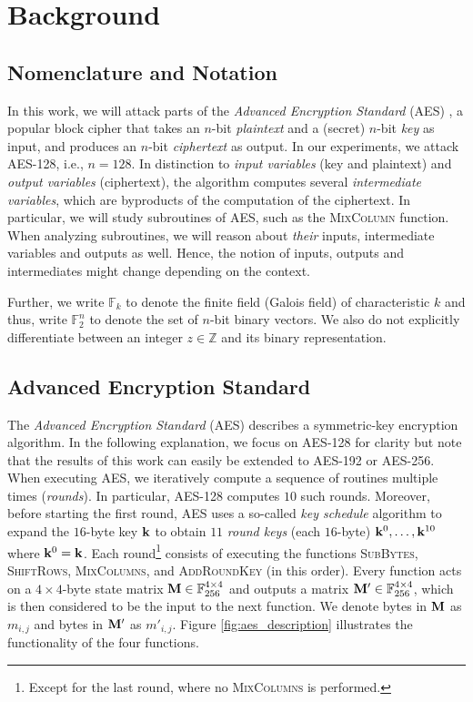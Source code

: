 \chapter{Background}
\label{cha:background}
\section{Nomenclature and Notation}
In this work, we will attack parts of the \textit{Advanced Encryption Standard} (AES) \cite{aes}, a popular block cipher that takes an $n$-bit \emph{plaintext} and a (secret) $n$-bit \emph{key} as input, and produces an $n$-bit \emph{ciphertext} as output. In our experiments, we attack AES-128, i.e., $n=128$. In distinction to \emph{input variables} (key and plaintext) and \emph{output variables} (ciphertext), the algorithm computes several \emph{intermediate variables}, which are byproducts of the computation of the ciphertext. In particular, we will study subroutines of AES, such as the \textsc{MixColumn} function. When analyzing subroutines, we will reason about \emph{their} inputs, intermediate variables and outputs as well. Hence, the notion of inputs, outputs and intermediates might change depending on the context. %

Further, we write $\mathbb{F}_k$ to denote the finite field (Galois field) of characteristic $k$ and thus, write $\mathbb{F}_2^n$ to denote the set of $n$-bit binary vectors. We also do not explicitly differentiate between an integer $z \in \mathbb{Z}$ and its binary representation.

\section{Advanced Encryption Standard}
\label{sec:aes_explanation}
The \emph{Advanced Encryption Standard} (AES) describes a symmetric-key encryption algorithm. In the following explanation, we focus on AES-128 for clarity but note that the results of this work can easily be extended to AES-192 or AES-256.
When executing AES, we iteratively compute a sequence of routines multiple times (\textit{rounds}). In particular, AES-128 computes $10$ such rounds. Moreover, before starting the first round, AES uses a so-called \emph{key schedule} algorithm to expand the $16$-byte key $\mathbf{k}$ to obtain $11$ \emph{round keys} (each $16$-byte) $\mathbf{k}^0, \dots, \mathbf{k}^{10}$ where $\mathbf{k}^0 = \mathbf{k}$. Each round\footnote{Except for the last round, where no \textsc{MixColumns} is performed.} consists of executing the functions \textsc{SubBytes}, \textsc{ShiftRows}, \textsc{MixColumns}, and \textsc{AddRoundKey} (in this order). Every function acts on a $4 \times 4$-byte state matrix $\mathbf{M} \in \mathbb{F}_{256}^{4 \times 4}$ and outputs a matrix $\mathbf{M}' \in \mathbb{F}_{256}^{4 \times 4}$, which is then considered to be the input to the next function. We denote bytes in $\mathbf{M}$ as $m_{i,j}$ and bytes in $\mathbf{M}'$ as $m'_{i,j}$. Figure \ref{fig:aes_description} illustrates the functionality of the four functions.

